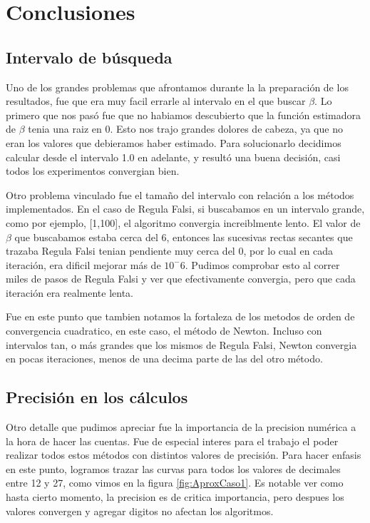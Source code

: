 \section{Conclusiones}

\subsection{Intervalo de b\'usqueda}

Uno de los grandes problemas que afrontamos durante la la preparaci\'on de los resultados,
fue que era muy facil errarle al intervalo en el que buscar $\beta$. Lo primero que nos pas\'o fue
que no habiamos descubierto que la funci\'on estimadora de $\beta$ tenia una raiz en 0. Esto nos trajo grandes
dolores de cabeza, ya que no eran los valores que debieramos haber estimado. Para solucionarlo decidimos calcular
desde el intervalo 1.0 en adelante, y result\'o una buena decisi\'on, casi todos los experimentos convergian bien.

Otro problema vinculado fue el tama\~no del intervalo con relaci\'on a los m\'etodos implementados. 
En el caso de Regula Falsi, si buscabamos en un intervalo grande, como por ejemplo, [1,100], el algoritmo 
convergia increiblmente lento. El valor de $\beta$ que buscabamos estaba cerca del 6, entonces las 
sucesivas rectas secantes que trazaba Regula Falsi tenian pendiente muy cerca del 0, por lo cual en cada 
iteraci\'on, era dificil mejorar m\'as de $10^-6$. Pudimos comprobar esto al correr miles de pasos de Regula Falsi y ver que efectivamente convergia, pero
que cada iteraci\'on era realmente lenta.

Fue en este punto que tambien notamos la fortaleza de los metodos de orden de convergencia cuadratico,
en este caso, el m\'etodo de Newton. Incluso con intervalos tan, o m\'as grandes que los mismos de Regula Falsi, 
Newton convergia en pocas iteraciones, menos de una decima parte de las del otro m\'etodo.


\subsection{Precisi\'on en los c\'alculos}

Otro detalle que pudimos apreciar fue la importancia de la precision num\'erica a la hora de hacer las cuentas. 
Fue de especial interes para el trabajo el poder realizar todos estos m\'etodos con distintos valores 
de precisi\'on. Para hacer enfasis en este punto, logramos trazar las curvas para todos los valores de decimales 
entre 12 y 27, como vimos en la figura \ref{fig:AproxCaso1}.
Es notable ver como hasta cierto momento, la precision es de critica importancia, pero despues los valores convergen y 
agregar digitos no afectan los algoritmos.

